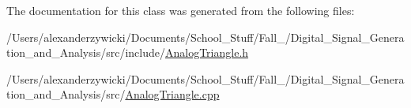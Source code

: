 The documentation for this class was generated from the following files\+:\begin{DoxyCompactItemize}
\item 
/\+Users/alexanderzywicki/\+Documents/\+School\+\_\+\+Stuff/\+Fall\+\_/\+Digital\+\_\+\+Signal\+\_\+\+Generation\+\_\+and\+\_\+\+Analysis/src/include/\hyperlink{AnalogTriangle_8h}{Analog\+Triangle.\+h}\item 
/\+Users/alexanderzywicki/\+Documents/\+School\+\_\+\+Stuff/\+Fall\+\_/\+Digital\+\_\+\+Signal\+\_\+\+Generation\+\_\+and\+\_\+\+Analysis/src/\hyperlink{AnalogTriangle_8cpp}{Analog\+Triangle.\+cpp}\end{DoxyCompactItemize}
